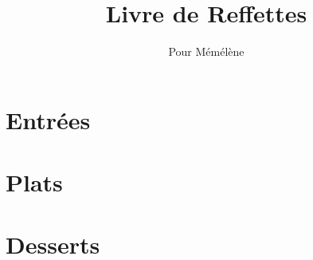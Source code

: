 \documentclass{recipe-book}
\title{Livre de Reffettes}
\author{Pour Mémélène}
\date{}
\begin{document}
\chapter{Entrées}
%
\chapter{Plats}

\chapter{Desserts}
\end{document}

